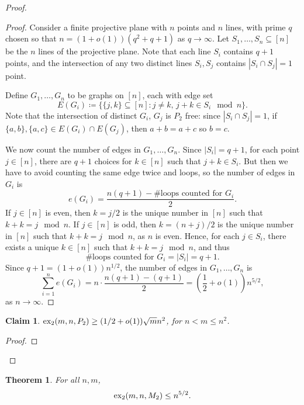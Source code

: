 \documentclass[10pt, reqno]{report}
\newtheorem{theorem}{Theorem}[chapter]
\newtheorem{claim}{Claim}[theorem]
\newcommand*{\dex}{\textnormal{ex}_2}
\begin{document}
\begin{proof}
\begin{proof}
    Consider a finite projective plane with $n$ points and $n$ lines, with prime $q$ chosen so that $n = (1 + o(1))(q^2 + q + 1)$ as $q \to \infty$. Let $S_1, \ldots, S_n \subseteq [n]$ be the $n$ lines of the projective plane. Note that each line $S_i$ contains $q + 1$ points, and the intersection of any two distinct lines $S_i, S_j$ contains $|S_i \cap S_j| = 1$ point. 
    
    Define $G_1, \ldots, G_n$ to be graphs on $[n]$, each with edge set
    \[
      E(G_i) \coloneq \{\{j, k\} \subseteq [n] : j \neq k, \, j + k \in S_i \mod n\}.
    \]
    Note that the intersection of distinct $G_i$, $G_j$ is $P_2$ free: since $|S_i \cap S_j| = 1$, if $\{a, b\}, \{a, c\} \in E(G_i) \cap E(G_j)$, then $a + b = a + c$ so $b = c$. 
    
    We now count the number of edges in $G_1, \ldots, G_n$. Since $|S_i| = q + 1$, for each point $j \in [n]$, there are $q + 1$ choices for $k \in [n]$ such that $j + k \in S_i$. But then we have to avoid counting the same edge twice and loops, so the number of edges in $G_i$ is
    \[
      e(G_i) = \frac{n(q + 1) - \#\text{loops counted for } G_i}{2}.
    \]
    If $j \in [n]$ is even, then $k = j/2$ is the unique number in $[n]$ such that $k + k = j \mod n$. If $j \in [n]$ is odd, then $k = (n + j)/2$ is the unique number in $[n]$ such that $k + k = j \mod n$, as $n$ is even. Hence, for each $j \in S_i$, there exists a unique $k \in [n]$ such that $k + k = j \mod n$, and thus
    \[
      \#\text{loops counted for } G_i = |S_i| = q + 1.
    \]
    Since $q + 1 = (1 + o(1))n^{1/2}$, the number of edges in $G_1, \ldots, G_n$ is
    \[
      \sum_{i = 1}^n e(G_i) = n \cdot \frac{n(q + 1) - (q + 1)}{2} = \left(\frac{1}{2} + o(1)\right)n^{5/2},
    \]
    as $n \to \infty$.
  \end{proof}
  \begin{claim}
    $\dex(m, n, P_2) \geq (1/2 + o(1))\sqrt{m}n^{2}$, for $n < m \leq n^2$.
  \end{claim}
  \begin{proof}
    
  \end{proof}
\end{proof}

\begin{theorem}
  For all $n, m$,
  \[
    \dex(m, n, M_2) \leq n^{5/2}.
  \]
\end{theorem}
\end{document}
